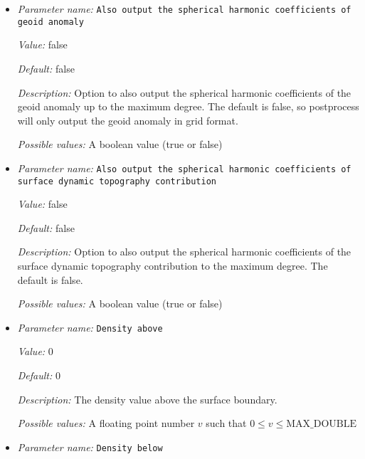 \begin{itemize}
{\it Possible values:} A boolean value (true or false)
\item {\it Parameter name:} {\tt Also output the spherical harmonic coefficients of geoid anomaly}
\label{parameters:Postprocess/Geoid/Also output the spherical harmonic coefficients of geoid anomaly}


{\it Value:} false


{\it Default:} false


{\it Description:} Option to also output the spherical harmonic coefficients of the geoid anomaly up to the maximum degree. The default is false, so postprocess will only output the geoid anomaly in grid format. 


{\it Possible values:} A boolean value (true or false)
\item {\it Parameter name:} {\tt Also output the spherical harmonic coefficients of surface dynamic topography contribution}
\label{parameters:Postprocess/Geoid/Also output the spherical harmonic coefficients of surface dynamic topography contribution}


{\it Value:} false


{\it Default:} false


{\it Description:} Option to also output the spherical harmonic coefficients of the surface dynamic topography contribution to the maximum degree. The default is false. 


{\it Possible values:} A boolean value (true or false)
\item {\it Parameter name:} {\tt Density above}
\label{parameters:Postprocess/Geoid/Density above}


{\it Value:} 0


{\it Default:} 0


{\it Description:} The density value above the surface boundary.


{\it Possible values:} A floating point number $v$ such that $0 \leq v \leq \text{MAX\_DOUBLE}$
\item {\it Parameter name:} {\tt Density below}
\label{parameters:Postprocess/Geoid/Density below}



\end{itemize}
